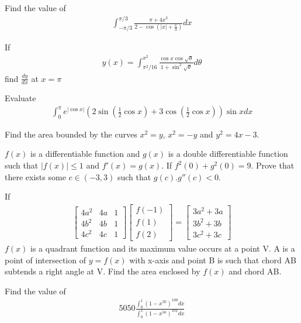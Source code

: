 \item Find the value of
\begin{align*}
\int_{-\pi/3}^{\pi/3}\frac{\pi + 4x^{3}}{2 - \cos \left(|x| + \frac{\pi}{3}\right)}dx
\end{align*}

\item If
\begin{align*}
y(x) = \int_{\pi^{2}/16}^{x^2}\frac{\cos x \cos\sqrt{\theta}}{1 + \sin^{2}\sqrt{\theta}}d\theta
\end{align*}
find $\frac{dy}{dx}$ at $x = \pi$

\item Evaluate
\begin{align*}
\int_{0}^{\pi}e^{|\cos x|}\left(2\sin\left(\frac{1}{2}\cos x\right) + 3\cos\left(\frac{1}{2}\cos x\right)\right)\sin x dx
\end{align*}

\item Find the area bounded by the curves $x^2 = y$, $x^2 = -y$ and $y^2 = 4x - 3$.

\item $f(x)$ is a differentiable function and $g(x)$ is a double differentiable function such that $|f(x)| \leq 1$ and
$f'(x) = g(x)$. If $f^2(0) + g^2(0) = 9$. Prove that there exists some $c \in (-3, 3)$ such that $g(c).g''(c) < 0$.

\item If
\begin{align*}
\begin{bmatrix}
4a^2 & 4a & 1 \\ 4b^2 & 4b & 1 \\ 4c^2 & 4c & 1
\end{bmatrix} \begin{bmatrix}
f(-1) \\ f(1) \\ f(2)
\end{bmatrix} = \begin{bmatrix}
3a^2 + 3a \\ 3b^2 + 3b \\ 3c^2 + 3c
\end{bmatrix}
\end{align*}
$f(x)$ is a quadrant function and its maximum value occurs at a point V. A is a point of intersection of $y = f(x)$ with x-axis and point B is such that chord AB subtends a right angle at V. Find the area enclosed by $f(x)$ and chord AB.

\item  Find the value of
\begin{align*}
5050\frac{\int_{0}^{1}(1 - x^{50})^{100}dx}{\int_{0}^{1}(1 - x^{50})^{101}dx}
\end{align*}


